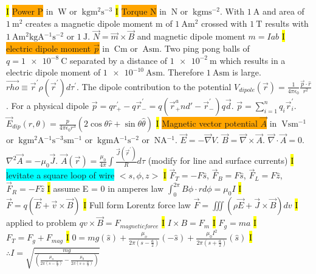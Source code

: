 \documentclass[fontsize=4pt]{scrartcl}
\begin{document}
\hl{I}
\colorbox{Orange}{Power P} in $\SI{}{\watt}$ or $\SI{}{\kilogram \meter^2 \second^{-3}}$
\hl{I}
\colorbox{Orange}{Torque N} in $\SI{}{\newton}$ or $\SI{}{\kilogram \meter \second^{-2}}$. With $\SI{1}{\ampere}$ and area of $\SI{1}{\meter^2}$ creates a magnetic dipole moment m of $\SI{1}{\ampere \meter^2}$ crossed with $\SI{1}{\tesla}$ results with $\SI{1}{\ampere \meter^2  \kilogram \ampere^{-1} \second^{-2}}$ or $\SI{1}{\joule}$. $\vec{N} = \vec{m} \times \vec{B}$ and magnetic dipole moment $m=Iab$
\hl{I}
\colorbox{Orange}{electric dipole moment $\vec{p}$} in $\SI{}{\coulomb \meter}$ or $\SI{}{\ampere \second \meter}$. Two ping pong balls of $q=\SI{1e-8}{\coulomb}$ separated by a distance of $\SI{1e-2}{\meter}$ which results in a electric dipole moment of $\SI{1e-10}{\ampere \second \meter}$. Therefore $\SI{1}{\ampere \second \meter}$ is large. $\vec{rho} \equiv \vec{r}^{\prime} \rho(\vec{r}^{\prime}) d\tau^{\prime}$. The dipole contribution to the potential $V_{dipole}(\vec{r}) = \frac{1}{4\pi \epsilon_0}\frac{\vec{p} \cdot \hat{r}}{r^2}$. For a physical dipole $\vec{p} = qr_+^{\prime} - q\vec{r}_-^{\prime} = q(\vec{r}_+^and {\prime} - \vec{r}_-^{\prime}) q\vec{d}$. $\vec{p} = \sum_{i=1}^{n}q_i \vec{r}_i^{\prime}$. $\vec{E}_{dip}(r,\theta) = \frac{p}{4\pi \epsilon_0 r^3}(2\cos \theta \hat{r} + \sin \theta \hat{\theta})$
\hl{I}
\colorbox{Orange}{Magnetic vector potential $\vec{A}$} in $\SI{}{\volt \second \meter^{-1}}$ or $\SI{}{\kilogram \meter^2\ampere^{-1}\second^{-3} \second \meter^{-1}}$ or $\SI{}{\kilogram \meter \ampere^{-1}\second^{-2} }$ or $\SI{}{\newton \ampere^{-1}}$. $\vec{E} = - \vec{\nabla} V$. $\vec{B} = \vec{\nabla} \times \vec{A}$. $\vec{\nabla} \cdot \vec{A} = 0$. $\nabla^2 \vec{A} = -\mu_0 \vec{J}$. $\vec{A}(\vec{r}) = \frac{\mu_0}{4\pi} \int \frac{\vec{J}(\vec{r}^{\prime})}{R}d\tau$ (modify for line and surface currents)
\hl{I}
\colorbox{Cyan}{levitate a square loop of wire}
$<s,\phi,z>$
\hl{I}
$\vec{F}_T = -F\hat{s}$, $\vec{F}_B = F\hat{s}$, $\vec{F}_L = F\hat{z}$, $\vec{F}_R = -F\hat{z}$
\hl{I}
assume E = 0 in amperes law $\int_{0}^{2\pi} B \phi \cdot rd\phi = \mu_0 I$
\hl{I}
$\vec{F} = q(\vec{E} + \vec{v} \times \vec{B})$
\hl{I}
Full form Lorentz force law $\vec{F} =  \iiint (\rho \vec{E} + \vec{J} \times \vec{B})dv$
\hl{I}
applied to problem $qv \times \vec{B} = F_{magnetic force}$
\hl{I}
$I \times B = F_{m}$
\hl{I}
$F_g = ma$
\hl{I}
$F_T = F_g + F_{mag}$
\hl{I}
$0 = mg(\hat{s}) + \frac{\mu_o}{2\pi (s-\frac{a}{2})}(-\hat{s}) + \frac{\mu_0 I^2}{2\pi(s+\frac{a}{2})}(\hat{s})$
\hl{I}
$\therefore I = \sqrt{\frac{mg}{(\frac{\mu_u}{2\pi(s-\frac{a}{2})} - \frac{\mu_0}{2\pi (s+\frac{a}{2})})}}$
\end{document}

